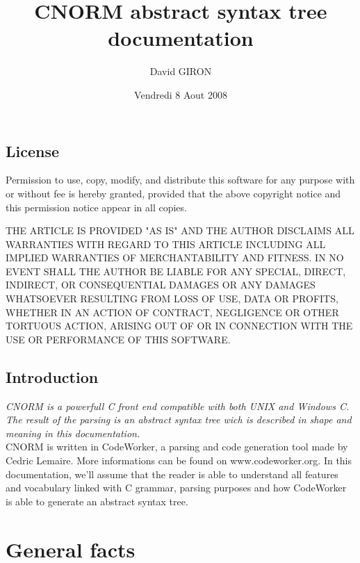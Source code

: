 \documentclass[a4paper,11pt]{report}
\title{CNORM abstract syntax tree documentation}
\author{David GIRON}
\date{Vendredi 8 Aout 2008}
\begin{document}
  \maketitle




  \section*{License}

  Permission to use, copy, modify, and distribute this software for any
  purpose with or without fee is hereby granted, provided that the above
  copyright notice and this permission notice appear in all copies.

  THE ARTICLE IS PROVIDED "AS IS" AND THE AUTHOR DISCLAIMS ALL WARRANTIES
  WITH REGARD TO THIS ARTICLE INCLUDING ALL IMPLIED WARRANTIES OF
  MERCHANTABILITY AND FITNESS. IN NO EVENT SHALL THE AUTHOR BE LIABLE FOR
  ANY SPECIAL, DIRECT, INDIRECT, OR CONSEQUENTIAL DAMAGES OR ANY DAMAGES
  WHATSOEVER RESULTING FROM LOSS OF USE, DATA OR PROFITS, WHETHER IN AN
  ACTION OF CONTRACT, NEGLIGENCE OR OTHER TORTUOUS ACTION, ARISING OUT OF
  OR IN CONNECTION WITH THE USE OR PERFORMANCE OF THIS SOFTWARE.
  \newpage




  \section*{Introduction}

  \textit{CNORM is a powerfull C front end compatible with both UNIX and
  Windows C. The result of the parsing is an abstract syntax tree wich is
  described in shape and meaning in this documentation.}\\
  
  CNORM is written in CodeWorker, a parsing and code generation tool made by
  Cedric Lemaire. More informations can be found on www.codeworker.org.
  In this documentation, we'll assume that the reader is able to understand 
  all features and vocabulary linked with C grammar, parsing purposes and how
  CodeWorker is able to generate an abstract syntax tree.
  
  \chapter{General facts}
\end{document}
